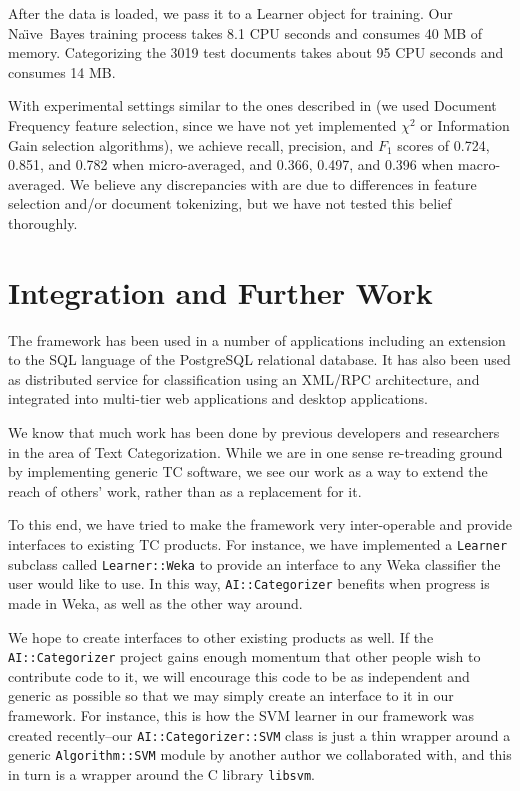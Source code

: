 \documentclass[twocolumn]{article}
\newcommand{\naive}{Na\"\i ve}
\begin{document}
After the data is loaded, we pass it to a Learner object for training.
Our \naive\ Bayes training process takes 8.1 CPU seconds and consumes
40 MB of memory.  Categorizing the 3019 test documents takes about 95
CPU seconds and consumes 14 MB.

With experimental settings similar to the ones described in
\cite{yang:99} (we used Document Frequency feature selection, since we
have not yet implemented $\chi^2$ or Information Gain selection
algorithms), we achieve recall, precision, and $F_1$ scores of 0.724,
0.851, and 0.782 when micro-averaged, and 0.366, 0.497, and 0.396 when
macro-averaged.  We believe any discrepancies with \cite{yang:99} are
due to differences in feature selection and/or document tokenizing,
but we have not tested this belief thoroughly.

\section{Integration and Further Work}


The framework has been used in a number of applications including an
extension to the SQL language of the PostgreSQL relational
database. It has also been used as distributed service for
classification using an XML/RPC architecture, and integrated into
multi-tier web applications and desktop applications.

We know that much work has been done by previous developers and
researchers in the area of Text Categorization.  While we are in one
sense re-treading ground by implementing generic TC software, we see
our work as a way to extend the reach of others' work, rather than as
a replacement for it.

To this end, we have tried to make the framework very inter-operable
and provide interfaces to existing TC products.  For instance, we have
implemented a \texttt{Learner} subclass called \texttt{Learner::Weka}
to provide an interface to any Weka classifier the user would like to
use.  In this way, \texttt{AI::Categorizer} benefits when progress is
made in Weka, as well as the other way around.

We hope to create interfaces to other existing products as well.  If the
\texttt{AI::Categorizer} project gains enough momentum that other
people wish to contribute code to it, we will encourage this code to
be as independent and generic as possible so that we may simply
create an interface to it in our framework.  For instance, this is 
how the SVM learner in our framework was created recently--our
\texttt{AI::Categorizer::SVM} class is just a thin wrapper around a
generic \texttt{Algorithm::SVM} module by another author we
collaborated with, and this in turn is a wrapper around the C library
\texttt{libsvm}.
\end{document}
